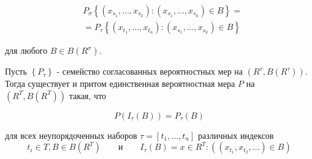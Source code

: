 $$
\begin{aligned}
& P_{\sigma}\left\{\left(x_{s_{1}}, \ldots, x_{s_{k}}\right):\left(x_{s_{1}}, \ldots, x_{s_{k}}\right) \in B\right\}= \\
& =P_{\tau}\left\{\left(x_{t_{1}}, \ldots, x_{t_{n}}\right):\left(x_{s_{1}}, \ldots, x_{s_{k}}\right) \in B\right\}
\end{aligned}
$$

для любого $B \in {B}\left(R^{\sigma}\right)$.

\begin{theorem} Пусть $\left\{P_{\tau}\right\}$ - семейство согласованных вероятностных мер на $\left(R^{\tau}, {B}\left(R^{\tau}\right)\right)$. Тогда существует и притом единственная вероятностная мера ${P}$ на $\left(R^{T}, {B}\left(R^{T}\right)\right)$ такая, что 

$$
{P}\left({I}_{\tau}(B)\right)=P_{\tau}(B)
$$

для всех неупорядоченных наборов $\tau=\left[t_{1}, \ldots, t_{n}\right]$ различных индексов
$$
t_i \in T, B \in {B}\left(R^{T}\right) \quad \quad \text{и} \quad \quad {I}_{\tau}(B) = {x \in R^T : (\left(x_{t_{1}}, x_{t_{2}}, \ldots\right) \in B)} $$
\end{theorem}

